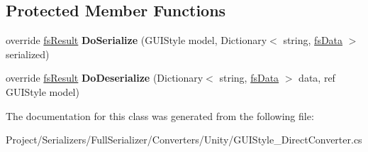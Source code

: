 \subsection*{Protected Member Functions}
\begin{DoxyCompactItemize}
\item 
\mbox{\label{class_full_serializer_1_1_internal_1_1_direct_converters_1_1_g_u_i_style___direct_converter_aad30e70d6777a78e62406c4072e45eac}} 
override \hyperlink{struct_full_serializer_1_1fs_result}{fs\+Result} {\bfseries Do\+Serialize} (G\+U\+I\+Style model, Dictionary$<$ string, \hyperlink{class_full_serializer_1_1fs_data}{fs\+Data} $>$ serialized)
\item 
\mbox{\label{class_full_serializer_1_1_internal_1_1_direct_converters_1_1_g_u_i_style___direct_converter_a99d5f6622d24b284ce9a032f493ba1d2}} 
override \hyperlink{struct_full_serializer_1_1fs_result}{fs\+Result} {\bfseries Do\+Deserialize} (Dictionary$<$ string, \hyperlink{class_full_serializer_1_1fs_data}{fs\+Data} $>$ data, ref G\+U\+I\+Style model)
\end{DoxyCompactItemize}


The documentation for this class was generated from the following file\+:\begin{DoxyCompactItemize}
\item 
Project/\+Serializers/\+Full\+Serializer/\+Converters/\+Unity/G\+U\+I\+Style\+\_\+\+Direct\+Converter.\+cs\end{DoxyCompactItemize}
